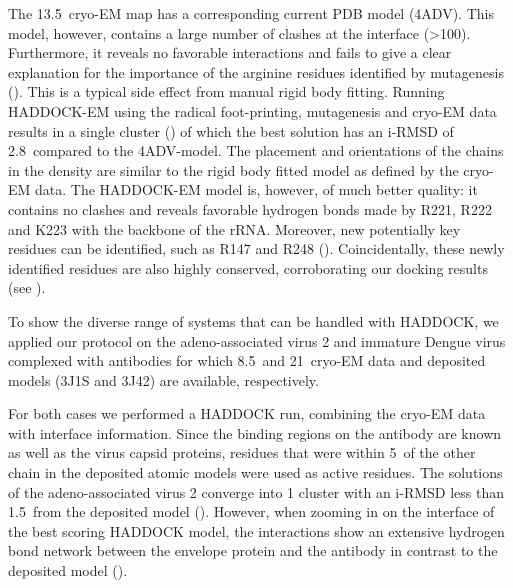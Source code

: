 The 13.5\Angstrom\ cryo-EM map has a corresponding current PDB model (4ADV).
This model, however, contains a large number of clashes at the interface
(>100).  Furthermore, it reveals no favorable interactions and fails to give a
clear explanation for the importance of the arginine residues identified by
mutagenesis ().  This is a typical side effect
from manual rigid body fitting.  Running HADDOCK-EM using the radical
foot-printing, mutagenesis and cryo-EM data results in a single cluster
() of which the best solution has an i-RMSD of
2.8\Angstrom\ compared to the 4ADV-model.  The placement and orientations of
the chains in the density are similar to the rigid body fitted model as defined
by the cryo-EM data. The HADDOCK-EM model is, however, of much better quality:
it contains no clashes and reveals favorable hydrogen bonds made by R221, R222
and K223 with the backbone of the rRNA.  Moreover, new potentially key residues
can be identified, such as R147 and R248 ().
Coincidentally, these newly identified residues are also highly conserved,
corroborating our docking results (see ).



{}

To show the diverse range of systems that can be handled with HADDOCK, we
applied our protocol on the adeno-associated virus 2 and immature Dengue virus
complexed with antibodies for which 8.5\Angstrom\ and 21\Angstrom\ cryo-EM data
and deposited models (3J1S and 3J42) are available, respectively.

For both cases we performed a HADDOCK run, combining the cryo-EM data with
interface information. Since the binding regions on the antibody are known as
well as the virus capsid proteins, residues that were within 5\Angstrom\ of the
other chain in the deposited atomic models were used as active residues.  The
solutions of the adeno-associated virus 2 converge into 1 cluster with an
i-RMSD less than 1.5\Angstrom\ from the deposited model
().  However, when zooming in on the interface
of the best scoring HADDOCK model, the interactions show an extensive hydrogen
bond network between the envelope protein and the antibody in contrast to the
deposited model (). 

